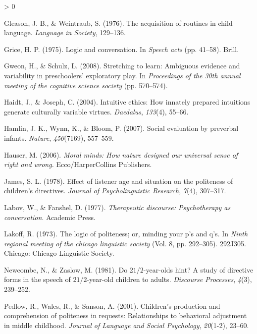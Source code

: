 \documentclass[
  english,
  man,floatsintext]{apa6}
\newlength{\cslhangindent}
\newenvironment{CSLReferences}[2] %
 {%
  \setlength{\parindent}{0pt}
  \ifodd #1 \everypar{\setlength{\hangindent}{\cslhangindent}}\ignorespaces\fi
  \ifnum #2 > 0
  \setlength{\parskip}{#2\baselineskip}
  \fi
 }%
 {}
\begin{document}
\begin{CSLReferences}{1}{0}
\leavevmode\hypertarget{ref-gleason1976}{}%
Gleason, J. B., \& Weintraub, S. (1976). The acquisition of routines in child language. \emph{Language in Society}, 129--136.

\leavevmode\hypertarget{ref-grice1975}{}%
Grice, H. P. (1975). Logic and conversation. In \emph{Speech acts} (pp. 41--58). Brill.

\leavevmode\hypertarget{ref-gweon2008}{}%
Gweon, H., \& Schulz, L. (2008). Stretching to learn: Ambiguous evidence and variability in preschoolers' exploratory play. In \emph{Proceedings of the 30th annual meeting of the cognitive science society} (pp. 570--574).

\leavevmode\hypertarget{ref-haidt2004}{}%
Haidt, J., \& Joseph, C. (2004). Intuitive ethics: How innately prepared intuitions generate culturally variable virtues. \emph{Daedalus}, \emph{133}(4), 55--66.

\leavevmode\hypertarget{ref-hamlin2007}{}%
Hamlin, J. K., Wynn, K., \& Bloom, P. (2007). Social evaluation by preverbal infants. \emph{Nature}, \emph{450}(7169), 557--559.

\leavevmode\hypertarget{ref-hauser2006}{}%
Hauser, M. (2006). \emph{Moral minds: How nature designed our universal sense of right and wrong.} Ecco/HarperCollins Publishers.

\leavevmode\hypertarget{ref-james1978}{}%
James, S. L. (1978). Effect of listener age and situation on the politeness of children's directives. \emph{Journal of Psycholinguistic Research}, \emph{7}(4), 307--317.

\leavevmode\hypertarget{ref-labov1977}{}%
Labov, W., \& Fanshel, D. (1977). \emph{Therapeutic discourse: Psychotherapy as conversation}. Academic Press.

\leavevmode\hypertarget{ref-lakoff1973}{}%
Lakoff, R. (1973). The logic of politeness; or, minding your p's and q's. In \emph{Ninth regional meeting of the chicago linguistic society} (Vol. 8, pp. 292--305). 292J305. Chicago: Chicago Linguistic Society.

\leavevmode\hypertarget{ref-newcombe1981}{}%
Newcombe, N., \& Zaslow, M. (1981). Do 2\(1/2\)-year-olds hint? A study of directive forms in the speech of 2\(1/2\)-year-old children to adults. \emph{Discourse Processes}, \emph{4}(3), 239--252.

\leavevmode\hypertarget{ref-pedlow2001}{}%
Pedlow, R., Wales, R., \& Sanson, A. (2001). Children's production and comprehension of politeness in requests: Relationships to behavioral adjustment in middle childhood. \emph{Journal of Language and Social Psychology}, \emph{20}(1-2), 23--60.


\end{CSLReferences}
\end{document}
